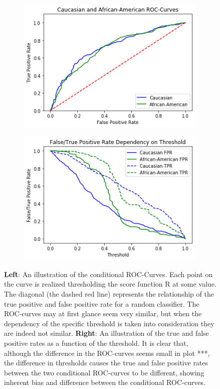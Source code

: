 \documentclass[11pt, fleqn, titlepage]{article}
\begin{document}
	\begin{figure}[H]
		\centering
		\begin{subfigure}{0.5\textwidth}
			\centering
			\includegraphics[width=0.9\linewidth]{imgs/ROC.png}
		\end{subfigure}%
		\begin{subfigure}{0.5\textwidth}
			\centering
			\includegraphics[width=0.9\linewidth]{imgs/fpr_tpr_plot.png}
		\end{subfigure}
		\caption{\textbf{Left}: An illustration of the conditional ROC-Curves. Each point on the curve is realized thresholding the score function R at some value. The diagonal (the dashed red line) represents the relationship of the true positive and false positive rate for a random classifier. The ROC-curves may at first glance seem very similar, but when the dependency of the specific threshold is taken into consideration they are indeed not similar. \textbf{Right}: An illustration of the true and false positive rates as a function of the threshold. It is clear that, although the difference in the ROC-curves seems small in plot ***, the difference in thresholds causes the true and false positive rates between the two conditional ROC-curves to be different, showing inherent bias and difference between the conditional ROC-curves.}

\end{figure}
\end{document}
